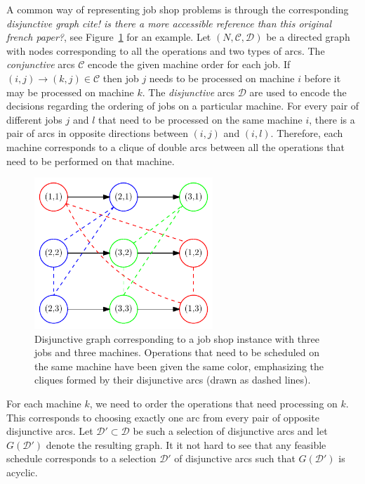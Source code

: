 \documentclass{article}
\theoremstyle{definition}
\theoremstyle{plain}
\begin{document}
A common way of representing job shop problems is through the corresponding
\textit{disjunctive graph} \textit{\color{blue}cite! is there a more accessible
  reference than this original french paper?}, see
Figure~\ref{fig:disjunctive-graph-example} for an example. Let
$(N, \mathcal{C}, \mathcal{D})$ be a directed graph with nodes corresponding to
all the operations and two types of arcs. The \textit{conjunctive} arcs
$\mathcal{C}$ encode the given machine order for each job. If
$(i,j) \rightarrow (k, j) \in \mathcal{C}$ then job $j$ needs to be processed on
machine $i$ before it may be processed on machine $k$. The \textit{disjunctive}
arcs $\mathcal{D}$ are used to encode the decisions regarding the ordering of
jobs on a particular machine. For every pair of different jobs $j$ and $l$ that
need to be processed on the same machine $i$, there is a pair of arcs in
opposite directions between $(i,j)$ and $(i,l)$. Therefore, each machine
corresponds to a clique of double arcs between all the operations that need to
be performed on that machine.

\begin{figure}[t]
  \centering
  \includegraphics[width=0.6\textwidth]{figures/disjunctive-graph.pdf}
  \caption{Disjunctive graph corresponding to a job shop instance with three
    jobs and three machines. Operations that need to be scheduled on the same
    machine have been given the same color, emphasizing the cliques formed by
    their disjunctive arcs (drawn as dashed lines).}
  \label{fig:disjunctive-graph-example}
\end{figure}

For each machine $k$, we need to order the operations that need processing on
$k$. This corresponds to choosing exactly one arc from every pair of opposite
disjunctive arcs. Let $\mathcal{D}' \subset \mathcal{D}$ be such a selection of
disjunctive arcs and let $G(\mathcal{D}')$ denote the resulting graph. It it not
hard to see that any feasible schedule corresponds to a selection $\mathcal{D}'$
of disjunctive arcs such that $G(\mathcal{D}')$ is acyclic.
\end{document}
